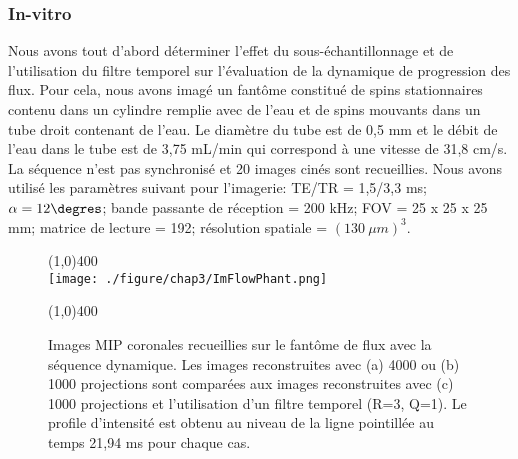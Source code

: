 \subsubsection{In-vitro}
Nous avons tout d'abord déterminer l'effet du sous-échantillonnage et de l'utilisation du filtre temporel sur l'évaluation de la dynamique de progression des flux. Pour cela, nous avons imagé un fantôme constitué de spins stationnaires contenu dans un cylindre remplie avec de l'eau et de spins mouvants dans un tube droit contenant de l'eau. Le diamètre du tube est de 0,5 mm et le débit de l'eau dans le tube est de 3,75 mL/min qui correspond à une vitesse de 31,8 cm/s. La séquence n'est pas synchronisé et 20 images cinés sont recueillies. Nous avons utilisé les paramètres suivant pour l'imagerie: TE/TR = 1,5/3,3 ms; $\alpha=12\degres$; bande passante de réception = 200 kHz; FOV = 25 x 25 x 25 mm; matrice de lecture = 192; résolution spatiale = $(130 \ \mu m)^3$.
\begin{figure}[H]
\centering \line(1,0){400} \\
\texttt{[image: ./figure/chap3/ImFlowPhant.png]}
\caption[Image ARM dynamique sur fantôme]{\label{fig:ImFlowPhant} Images MIP coronales recueillies sur le fantôme de flux avec la séquence dynamique. Les images reconstruites avec (a) 4000 ou (b) 1000 projections sont comparées aux images reconstruites avec (c) 1000 projections et l'utilisation d'un filtre temporel (R=3, Q=1). Le profile d'intensité est obtenu au niveau de la ligne pointillée au temps 21,94 ms pour chaque cas.}
\line(1,0){400} \\ \end{figure}

